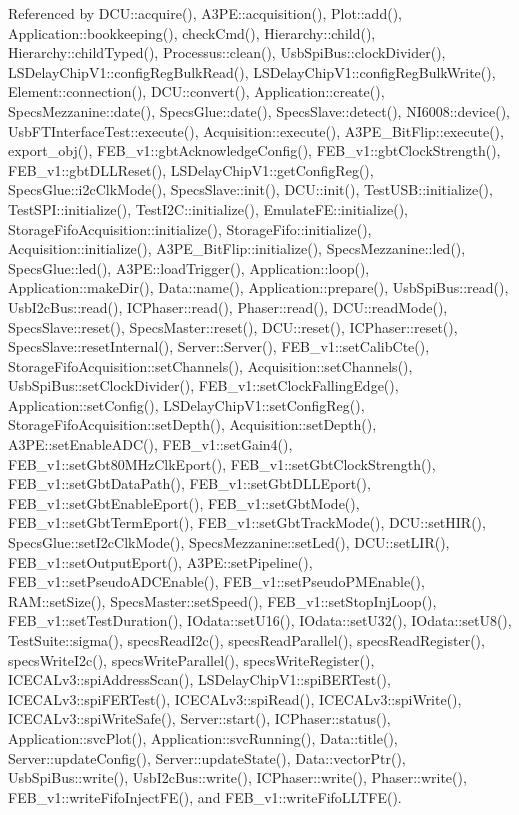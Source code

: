 Referenced by DCU::acquire(), A3PE::acquisition(), Plot::add(), Application::bookkeeping(), checkCmd(), Hierarchy::child(), Hierarchy::childTyped(), Processus::clean(), UsbSpiBus::clockDivider(), LSDelayChipV1::configRegBulkRead(), LSDelayChipV1::configRegBulkWrite(), Element::connection(), DCU::convert(), Application::create(), SpecsMezzanine::date(), SpecsGlue::date(), SpecsSlave::detect(), NI6008::device(), UsbFTInterfaceTest::execute(), Acquisition::execute(), A3PE\_\-BitFlip::execute(), export\_\-obj(), FEB\_\-v1::gbtAcknowledgeConfig(), FEB\_\-v1::gbtClockStrength(), FEB\_\-v1::gbtDLLReset(), LSDelayChipV1::getConfigReg(), SpecsGlue::i2cClkMode(), SpecsSlave::init(), DCU::init(), TestUSB::initialize(), TestSPI::initialize(), TestI2C::initialize(), EmulateFE::initialize(), StorageFifoAcquisition::initialize(), StorageFifo::initialize(), Acquisition::initialize(), A3PE\_\-BitFlip::initialize(), SpecsMezzanine::led(), SpecsGlue::led(), A3PE::loadTrigger(), Application::loop(), Application::makeDir(), Data::name(), Application::prepare(), UsbSpiBus::read(), UsbI2cBus::read(), ICPhaser::read(), Phaser::read(), DCU::readMode(), SpecsSlave::reset(), SpecsMaster::reset(), DCU::reset(), ICPhaser::reset(), SpecsSlave::resetInternal(), Server::Server(), FEB\_\-v1::setCalibCte(), StorageFifoAcquisition::setChannels(), Acquisition::setChannels(), UsbSpiBus::setClockDivider(), FEB\_\-v1::setClockFallingEdge(), Application::setConfig(), LSDelayChipV1::setConfigReg(), StorageFifoAcquisition::setDepth(), Acquisition::setDepth(), A3PE::setEnableADC(), FEB\_\-v1::setGain4(), FEB\_\-v1::setGbt80MHzClkEport(), FEB\_\-v1::setGbtClockStrength(), FEB\_\-v1::setGbtDataPath(), FEB\_\-v1::setGbtDLLEport(), FEB\_\-v1::setGbtEnableEport(), FEB\_\-v1::setGbtMode(), FEB\_\-v1::setGbtTermEport(), FEB\_\-v1::setGbtTrackMode(), DCU::setHIR(), SpecsGlue::setI2cClkMode(), SpecsMezzanine::setLed(), DCU::setLIR(), FEB\_\-v1::setOutputEport(), A3PE::setPipeline(), FEB\_\-v1::setPseudoADCEnable(), FEB\_\-v1::setPseudoPMEnable(), RAM::setSize(), SpecsMaster::setSpeed(), FEB\_\-v1::setStopInjLoop(), FEB\_\-v1::setTestDuration(), IOdata::setU16(), IOdata::setU32(), IOdata::setU8(), TestSuite::sigma(), specsReadI2c(), specsReadParallel(), specsReadRegister(), specsWriteI2c(), specsWriteParallel(), specsWriteRegister(), ICECALv3::spiAddressScan(), LSDelayChipV1::spiBERTest(), ICECALv3::spiFERTest(), ICECALv3::spiRead(), ICECALv3::spiWrite(), ICECALv3::spiWriteSafe(), Server::start(), ICPhaser::status(), Application::svcPlot(), Application::svcRunning(), Data::title(), Server::updateConfig(), Server::updateState(), Data::vectorPtr(), UsbSpiBus::write(), UsbI2cBus::write(), ICPhaser::write(), Phaser::write(), FEB\_\-v1::writeFifoInjectFE(), and FEB\_\-v1::writeFifoLLTFE().


